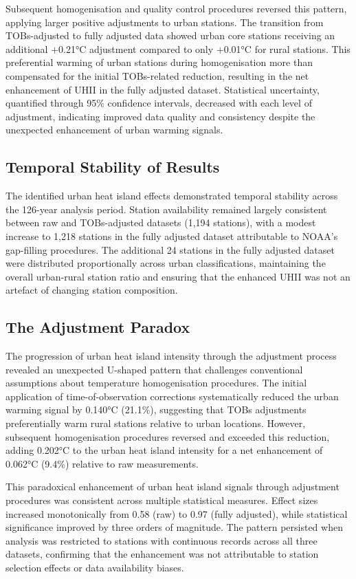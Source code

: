 \documentclass[11pt, a4paper]{article}
\begin{document}
Subsequent homogenisation and quality control procedures reversed this pattern, applying larger positive adjustments to urban stations. The transition from TOBs-adjusted to fully adjusted data showed urban core stations receiving an additional $+$0.21°C adjustment compared to only $+$0.01°C for rural stations. This preferential warming of urban stations during homogenisation more than compensated for the initial TOBs-related reduction, resulting in the net enhancement of UHII in the fully adjusted dataset. Statistical uncertainty, quantified through 95\% confidence intervals, decreased with each level of adjustment, indicating improved data quality and consistency despite the unexpected enhancement of urban warming signals.

\subsection{Temporal Stability of Results}

The identified urban heat island effects demonstrated temporal stability across the 126-year analysis period. Station availability remained largely consistent between raw and TOBs-adjusted datasets (1,194 stations), with a modest increase to 1,218 stations in the fully adjusted dataset attributable to NOAA's gap-filling procedures. The additional 24 stations in the fully adjusted dataset were distributed proportionally across urban classifications, maintaining the overall urban-rural station ratio and ensuring that the enhanced UHII was not an artefact of changing station composition.

\subsection{The Adjustment Paradox}

The progression of urban heat island intensity through the adjustment process revealed an unexpected U-shaped pattern that challenges conventional assumptions about temperature homogenisation procedures. The initial application of time-of-observation corrections systematically reduced the urban warming signal by 0.140°C (21.1\%), suggesting that TOBs adjustments preferentially warm rural stations relative to urban locations. However, subsequent homogenisation procedures reversed and exceeded this reduction, adding 0.202°C to the urban heat island intensity for a net enhancement of 0.062°C (9.4\%) relative to raw measurements.


This paradoxical enhancement of urban heat island signals through adjustment procedures was consistent across multiple statistical measures. Effect sizes increased monotonically from 0.58 (raw) to 0.97 (fully adjusted), while statistical significance improved by three orders of magnitude. The pattern persisted when analysis was restricted to stations with continuous records across all three datasets, confirming that the enhancement was not attributable to station selection effects or data availability biases.
\end{document}
